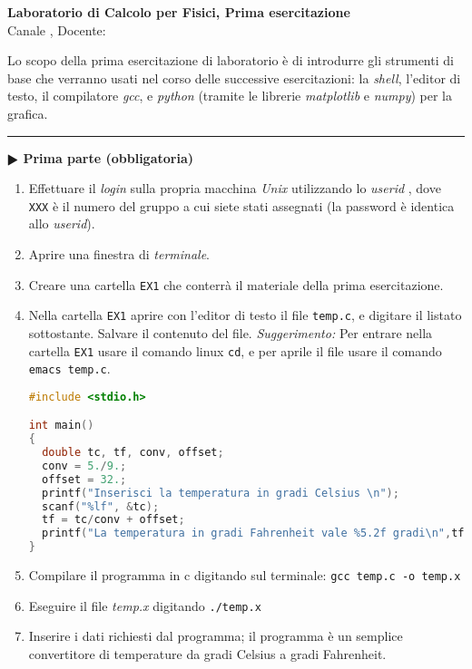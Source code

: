 \documentclass[11pt]{article}
\begin{document}
\pagestyle{empty}

\begin{center}
{\Large \bf  Laboratorio di Calcolo per Fisici, Prima esercitazione\\[2mm]}
{\large Canale \canale, Docente: \docente}
\end{center}
\vspace{4mm}

\begin{mdframed}[backgroundcolor=panna]
  Lo scopo della prima esercitazione di laboratorio \`e di introdurre gli strumenti di base che verranno usati nel corso delle successive esercitazioni:
  la {\em shell}, l'editor di testo, il compilatore {\em gcc}, e {\em python\/} (tramite le librerie
  {\em matplotlib\/} e {\em numpy\/}) per la grafica.
\\
\end{mdframed}
%
%

\hrule
\vspace{2mm}
\textbf{$\RHD$ Prima parte (obbligatoria)} 
\begin{enumerate}
\item Effettuare il {\em login\/} sulla propria macchina {\em Unix\/} utilizzando lo {\em userid\/} \texttt{\login}, 
  dove \texttt{XXX} \`e il numero del gruppo a cui siete stati assegnati (la password è identica allo {\em userid\/}).
\item Aprire una finestra di {\em terminale}.
\item Creare una cartella  \texttt{EX1} che conterrà il materiale della prima esercitazione.
\item Nella cartella \texttt{EX1} aprire con l'editor di testo il file \texttt{temp.c}, e digitare il listato sottostante. Salvare il contenuto del file. {\em Suggerimento:} Per entrare nella cartella \texttt{EX1} usare il comando linux \texttt{cd}, e per aprile il file usare il comando \texttt{emacs temp.c}.
\begin{lstlisting}[caption={Programma \texttt{temp.c}},language=c]
#include <stdio.h>

int main()
{
  double tc, tf, conv, offset;
  conv = 5./9.;
  offset = 32.;
  printf("Inserisci la temperatura in gradi Celsius \n");
  scanf("%lf", &tc);
  tf = tc/conv + offset;
  printf("La temperatura in gradi Fahrenheit vale %5.2f gradi\n",tf);
}
\end{lstlisting}
\item Compilare il programma in c digitando sul terminale:
  \texttt{gcc temp.c -o temp.x}
\item Eseguire il file {\em temp.x\/} digitando \texttt{./temp.x}
\item Inserire i dati richiesti dal programma; il programma \`e un semplice convertitore di temperature da gradi Celsius a gradi Fahrenheit.
\end{enumerate}
\end{document}
